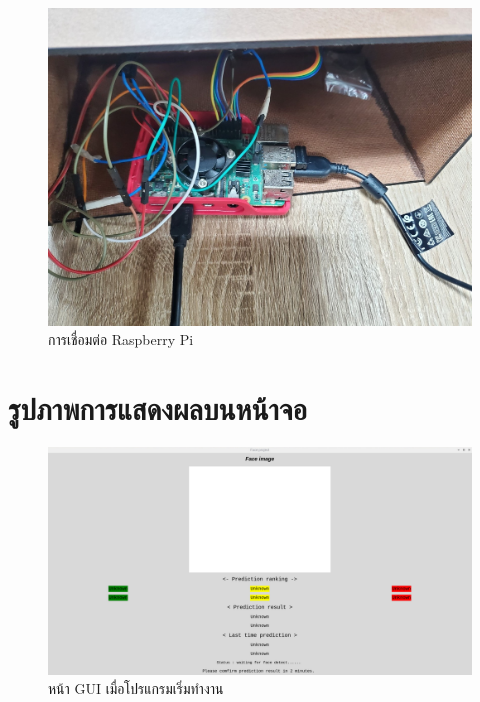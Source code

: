 \begin{figure}[!ht]
  \begin{center}
    \includegraphics[scale=.17]{pic/rpi.jpg}
    \caption[การเชื่อมต่อ Raspberry Pi]{การเชื่อมต่อ Raspberry Pi}
    \label{fig:rpi_module}
  \end{center}
\end{figure}

\newpage
\section{รูปภาพการแสดงผลบนหน้าจอ}

\begin{figure}[!ht]
    \begin{center}
      \includegraphics[scale=.35]{pic/main_page.png}
      \caption[หน้า GUI เมื่อโปรแกรมเริ่มทำงาน]{หน้า GUI เมื่อโปรแกรมเริ่มทำงาน}
      \label{fig:main_page}
    \end{center}
\end{figure}



